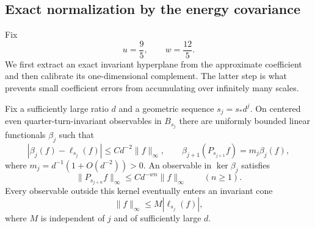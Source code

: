 \subsection{Exact normalization by the energy covariance}

Fix
\[
 u=\frac95,\qquad w=\frac{12}5.
\]
We first extract an exact invariant hyperplane from the approximate
coefficient and then calibrate its one-dimensional complement.  The latter
step is what prevents small coefficient errors from accumulating over
infinitely many scales.

\begin{lemma}
\label{pure:hyperplane}
Fix a sufficiently large ratio $d$ and a geometric sequence $s_j=s_*d^j$.
On centered even quarter-turn-invariant observables in $B_{s_j}$ there
are uniformly bounded linear functionals $\beta_j$ such that
\[
 |\beta_j(f)-\ell_{s_j}(f)|\leq C d^{-2}\|f\|_\infty,
 \qquad
 \beta_{j+1}(P_{s_{j+1}}f)=m_j\beta_j(f),
\]
where $m_j=d^{-1}(1+O(d^{-2}))>0$.
An observable in $\ker\beta_j$ satisfies
\begin{equation}
 \|P_{s_{j+n}}f\|_\infty
      \leq C d^{-wn}\|f\|_\infty\qquad(n\geq1).
 \label{pure:stable-decay}
\end{equation}
Every observable outside this kernel eventually enters an invariant cone
\begin{equation}
 \|f\|_\infty\leq M|\ell_{s_j}(f)|,
 \label{pure:cone}
\end{equation}
where $M$ is independent of $j$ and of sufficiently large $d$.
\end{lemma}


